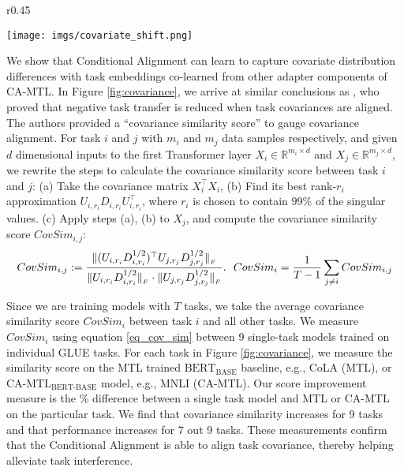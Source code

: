 \documentclass{article} \usepackage{iclr2021_conference,times}
\newcommand{\norm}[1]{\|#1\|}
\newcommand{\normFro}[1]{\norm{#1}_{_{F}}}
\begin{document}
\begin{wrapfigure}[14]{r}{0.45\textwidth}
    \begin{center}
        \vspace{-16pt}
        \hspace{-5pt}
        \texttt{[image: imgs/covariate\_shift.png]}
    \end{center}
     \caption{\label{fig:covariance} \small
     Task performance vs. avg. covariance similarity scores (eq. \ref{eq_cov_sim}) for MTL and CA-MTL.}
\end{wrapfigure}

 We show that Conditional Alignment can learn to capture covariate distribution differences with task embeddings co-learned from other adapter components of CA-MTL. In Figure \ref{fig:covariance}, we arrive at similar conclusions as \cite{Wu2020Understanding}, who proved that negative task transfer is reduced when task covariances are aligned. The authors provided a ``covariance similarity score'' to gauge covariance alignment. For task $i$ and $j$ with $m_i$ and $m_j$ data samples respectively, and given $d$ dimensional inputs to the first Transformer layer $X_i \in\mathbb{R}^{m_i\times d}$ and $X_j \in\mathbb{R}^{m_j\times d}$, we rewrite the steps to calculate the covariance similarity score between task $i$ and $j$:
(a) Take the covariance matrix $X_i^{\top}X_i$,
(b) Find its best rank-$r_i$ approximation $U_{i,r_i}D_{i,r_i}U_{i,r_i}^{\top}$, where $r_i$ is chosen to contain $99\%$ of the singular values.
(c) Apply steps (a), (b) to $X_j$, and compute the covariance similarity score $CovSim_{i,j}$:
\begin{gather}
\label{eq_cov_sim}
  CovSim_{i,j} := {\small\frac{\normFro{(U_{i,r_i}D_{i,r_i}^{1/2})^{\top}U_{j,r_j}D_{j,r_j}^{1/2}}} {\normFro{U_{i,r_i}{D_{i,r_i}^{1/2}}} \cdot \normFro{U_{j,r_j}D_{j,r_j}^{1/2}}}}. \:\:\: CovSim_{i} = \frac{1}{T-1}\sum\limits_{j\neq i}CovSim_{i,j}
\end{gather}

Since we are training models with $T$ tasks, we take the average covariance similarity score $CovSim_{i}$ between task $i$ and all other tasks. We measure $CovSim_{i}$ using equation \ref{eq_cov_sim} between 9 single-task models trained on individual GLUE tasks. For each task in Figure \ref{fig:covariance}, we measure the similarity score on the MTL trained $\text{BERT}_{\text{BASE}}$ baseline, e.g., CoLA (MTL), or $\text{CA-MTL}_{\text{BERT-BASE}}$ model, e.g., MNLI (CA-MTL). Our score improvement measure is the \% difference between a single task model and MTL or CA-MTL on the particular task. We find that covariance similarity increases for 9 tasks and that performance increases for 7 out 9 tasks. These measurements confirm that the Conditional Alignment is able to align task covariance, thereby helping alleviate task interference.
\end{document}
